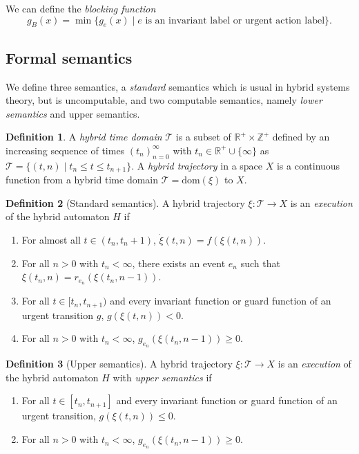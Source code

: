 \documentclass[english,a4paper]{article}
\newcommand{\Z}{\mathbb{Z}}
\newcommand{\R}{\mathbb{R}}
\theoremstyle{theorem}
\theoremstyle{definition}
\newtheorem*{definition*}{Definition}
\theoremstyle{remark}
\begin{document}
We can define the \emph{blocking function}
$$g_B(x) = \min\{g_e(x) \mid e \text{ is an invariant label or urgent action label} \} .$$


\subsection*{Formal semantics}

We define three semantics, a \emph{standard} semantics which is usual in hybrid systems theory, but is uncomputable, and two computable semantics, namely \emph{lower semantics} and upper semantics.

\begin{definition*}
A \emph{hybrid time domain} $\mathcal{T}$ is a subset of $\R^+\times\Z^+$ defined by an increasing sequence of times $(t_n)_{n=0}^{\infty}$ with $t_n\in \R^+\cup\{\infty\}$ as
$\mathcal{T} = \{(t,n) \mid t_n\leq t\leq t_{n+1} \}$. A \emph{hybrid trajectory} in a space $X$ is a continuous function from a hybrid time domain $\mathcal{T}=\mathrm{dom}(\xi)$ to $X$.
\end{definition*}

\begin{definition*}[Standard semantics]
A hybrid trajectory $\xi:\mathcal{T}\rightarrow X$ is an \emph{execution} of the hybrid automaton $H$ if
\begin{enumerate}
\item For almost all $t\in (t_n,t_n+1)$, $\dot{\xi}(t,n) = f(\xi(t,n))$.
\item For all $n>0$ with $t_n<\infty$, there exists an event $e_n$ such that $\xi(t_n,n)=r_{e_n}(\xi(t_n,n\!-\!1))$.
\item For all $t\in[t_n,t_{n+1})$ and every invariant function or guard function of an urgent transition $g$, $g(\xi(t,n)) < 0$.
\item For all $n>0$ with $t_n<\infty$, $g_{e_n}(\xi(t_n,n\!-\!1))\geq0$.
\end{enumerate}
\end{definition*}

\begin{definition*}[Upper semantics]
A hybrid trajectory $\xi:\mathcal{T}\rightarrow X$ is an \emph{execution} of the hybrid automaton $H$ with \emph{upper semantics} if
\begin{enumerate}\addtocounter{enumi}{2}
\item For all $t\in[t_n,t_{n+1}]$ and every invariant function or guard function of an urgent transition, $g(\xi(t,n)) \leq 0$.
\item For all $n>0$ with $t_n<\infty$, $g_{e_n}(\xi(t_n,n\!-\!1))\geq0$.
\end{enumerate}
\end{definition*}
\end{document}
